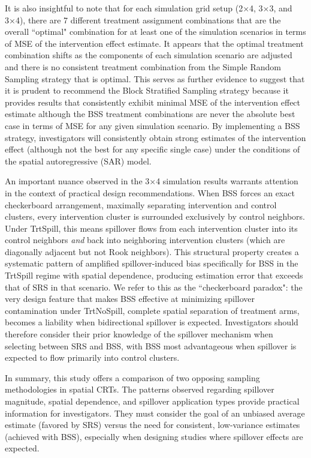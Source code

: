 \documentclass{article}[11pt]
\begin{document}
It is also insightful to note that for each simulation grid setup (2×4, 3×3, and 3×4), there are 7 different treatment assignment combinations that are the overall ``optimal" combination for at least one of the simulation scenarios in terms of MSE of the intervention effect estimate. It appears that the optimal treatment combination shifts as the components of each simulation scenario are adjusted and there is no consistent treatment combination from the Simple Random Sampling strategy that is optimal. This serves as further evidence to suggest that it is prudent to recommend the Block Stratified Sampling strategy because it provides results that consistently exhibit minimal MSE of the intervention effect estimate although the BSS treatment combinations are never the absolute best case in terms of MSE for any given simulation scenario. By implementing a BSS strategy, investigators will consistently obtain strong estimates of the intervention effect (although not the best for any specific single case) under the conditions of the spatial autoregressive (SAR) model.

An important nuance observed in the 3$\times$4 simulation results warrants attention in the context of practical design recommendations. When BSS forces an exact checkerboard arrangement, maximally separating intervention and control clusters, every intervention cluster is surrounded exclusively by control neighbors. Under TrtSpill, this means spillover flows from each intervention cluster into its control neighbors \emph{and} back into neighboring intervention clusters (which are diagonally adjacent but not Rook neighbors). This structural property creates a systematic pattern of amplified spillover-induced bias specifically for BSS in the TrtSpill regime with spatial dependence, producing estimation error that exceeds that of SRS in that scenario. We refer to this as the ``checkerboard paradox": the very design feature that makes BSS effective at minimizing spillover contamination under TrtNoSpill, complete spatial separation of treatment arms, becomes a liability when bidirectional spillover is expected. Investigators should therefore consider their prior knowledge of the spillover mechanism when selecting between SRS and BSS, with BSS most advantageous when spillover is expected to flow primarily into control clusters.

In summary, this study offers a comparison of two opposing sampling methodologies in spatial CRTs. The patterns observed regarding spillover magnitude, spatial dependence, and spillover application types provide practical information for investigators. They must consider the goal of an unbiased average estimate (favored by SRS) versus the need for consistent, low-variance estimates (achieved with BSS), especially when designing studies where spillover effects are expected.
\end{document}
